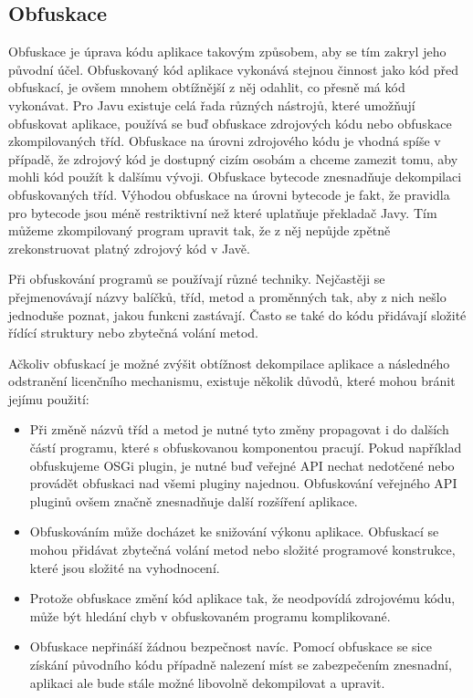 \subsection{Obfuskace}

Obfuskace je úprava kódu aplikace takovým způsobem, aby se tím zakryl jeho
původní účel. Obfuskovaný kód aplikace vykonává stejnou činnost jako kód před
obfuskací, je ovšem mnohem obtížnější z něj odahlit, co přesně má kód vykonávat.
Pro Javu existuje celá řada různých nástrojů, které umožňují obfuskovat
aplikace, používá se buď obfuskace zdrojových kódu nebo obfuskace zkompilovaných
tříd. Obfuskace na úrovni zdrojového kódu je vhodná spíše v případě, že zdrojový
kód je dostupný cizím osobám a chceme zamezit tomu, aby mohli kód použít k
dalšímu vývoji. Obfuskace bytecode znesnadňuje dekompilaci obfuskovaných tříd.
Výhodou obfuskace na úrovni bytecode je fakt, že pravidla pro bytecode jsou méně
restriktivní než které uplatňuje překladač Javy. Tím můžeme zkompilovaný program
upravit tak, že z něj nepůjde zpětně zrekonstruovat platný zdrojový kód v Javě.

Při obfuskování programů se používají různé techniky. Nejčastěji se
přejmenovávají názvy balíčků, tříd, metod a proměnných tak, aby z nich nešlo
jednoduše poznat, jakou funkcni zastávají. Často se také do kódu přidávají
složité řídící struktury nebo zbytečná volání metod.

Ačkoliv obfuskací je možné zvýšit obtížnost dekompilace aplikace a následného
odstranění licenčního mechanismu, existuje několik důvodů, které mohou bránit
jejímu použití:

\begin{itemize}
  \item Při změně názvů tříd a metod je nutné tyto změny propagovat i do dalších
  částí programu, které s obfuskovanou komponentou pracují. Pokud například
  obfuskujeme \gls{OSGi} plugin, je nutné buď veřejné \gls{API} nechat nedotčené
  nebo provádět obfuskaci nad všemi pluginy najednou. Obfuskování veřejného
  \gls{API} pluginů ovšem značně znesnadňuje další rozšíření aplikace.
  \item Obfuskováním může docházet ke snižování výkonu aplikace. Obfuskací se
  mohou přidávat zbytečná volání metod nebo složité programové konstrukce, které
  jsou složité na vyhodnocení.
  \item Protože obfuskace změní kód aplikace tak, že neodpovídá zdrojovému kódu,
  může být hledání chyb v obfuskovaném programu komplikované.
  \item Obfuskace nepřináší žádnou bezpečnost navíc. Pomocí obfuskace se sice
  získání původního kódu případně nalezení míst se zabezpečením znesnadní,
  aplikaci ale bude stále možné libovolně dekompilovat a upravit.
\end{itemize}


